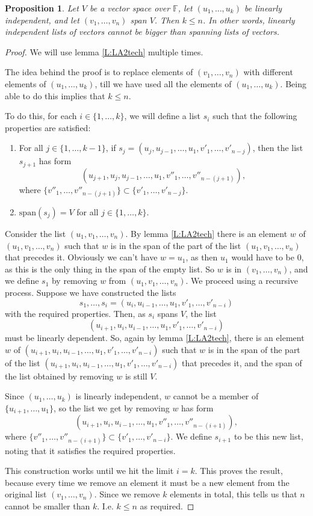 \documentclass{article}
\theoremstyle{plain}
\newtheorem{proposition}[theorem]{Proposition}{\bfseries}{\itshape}
\newcommand{\bF}{\mathbb{F}}
\newcommand{\spa}{\mathrm{span}}
\begin{document}
\begin{proposition}\label{P:LA2length}
Let $V$ be a vector space over $\bF$, let $(u_1,\ldots,u_k)$ be linearly independent, and let $(v_1,\ldots,v_n)$ span $V$. Then $k\leq n$. In other words, linearly independent lists of vectors cannot be bigger than spanning lists of vectors. 
\end{proposition}
\begin{proof}
We will use lemma \ref{L:LA2tech} multiple times.


The idea behind the proof is to replace elements of $(v_1,\ldots,v_n)$ with different elements of $(u_1,\ldots,u_k)$, till we have used all the elements of $(u_1,\ldots,u_k)$. Being able to do this implies that $k\leq n$. 

To do this, for each $i\in\{1,\ldots,k\}$, we will define a list $s_i$ such that the following properties are satisfied:
\begin{enumerate}
\item For all $j\in \{1,\ldots,k-1\}$, if $s_j = (u_j,u_{j-1},\ldots, u_1,v'_1,\ldots, v'_{n-j})$, then the list $s_{j+1}$ has form 
\[(u_{j+1},u_j,u_{j-1},\ldots, u_1,v''_1,\ldots, v''_{n-(j+1)}),\] 
where $\{v''_1,\ldots, v''_{n-(j+1)}\}\subset \{v'_1,\ldots, v'_{n-j}\}$. 
\item $\spa(s_j) = V$ for all $j\in \{1,\ldots,k\}$.
\end{enumerate}

Consider the list $(u_1,v_1,\ldots,v_n)$. By lemma \ref{L:LA2tech} there is an element $w$ of $(u_1,v_1,\ldots,v_n)$ such that $w$ is in the span of the part of the list $(u_1,v_1,\ldots,v_n)$ that precedes it. Obviously we can't have $w = u_1$, as then $u_1$ would have to be $0$, as this is the only thing in the span of the empty list. So $w$ is in $(v_1,\ldots,v_n)$, and we define $s_1$ by removing $w$ from $(u_1,v_1,\ldots,v_n)$. We proceed using a recursive process. Suppose we have constructed the lists 
\[s_1,\ldots,s_i = (u_i,u_{i-1},\ldots, u_1,v'_1,\ldots, v'_{n-i})\] 
with the required properties. Then, as $s_i$ spans $V$, the list 
\[(u_{i+1},u_i,u_{i-1},\ldots, u_1,v'_1,\ldots, v'_{n-i})\]
must be linearly dependent. So, again by lemma \ref{L:LA2tech}, there is an element $w$ of $(u_{i+1},u_i,u_{i-1},\ldots, u_1,v'_1,\ldots, v'_{n-i})$ such that $w$ is in the span of the part of the list $(u_{i+1},u_i,u_{i-1},\ldots, u_1,v'_1,\ldots, v'_{n-i})$ that precedes it, and the span of the list obtained by removing $w$ is still $V$. 

Since $(u_1,\ldots,u_k)$ is linearly independent, $w$ cannot be a member of $\{u_{i+1},\ldots, u_1\}$, so the list we get by removing $w$ has form 
\[(u_{i+1},u_i,u_{i-1},\ldots, u_1,v''_1,\ldots, v''_{n-(i+1)}),\] 
where $\{v''_1,\ldots, v''_{n-(i+1)}\}\subset \{v'_1,\ldots, v'_{n-i}\}$. We define $s_{i+1}$ to be this new list, noting that it satisfies the required properties.

This construction works until we hit the limit $i=k$. This proves the result, because every time we remove an element it must be a new element from the original list $(v_1,\ldots,v_n)$. Since we remove $k$ elements in total, this tells us that $n$ cannot be smaller than $k$. I.e. $k\leq n$ as required.  
\end{proof}
\end{document}
